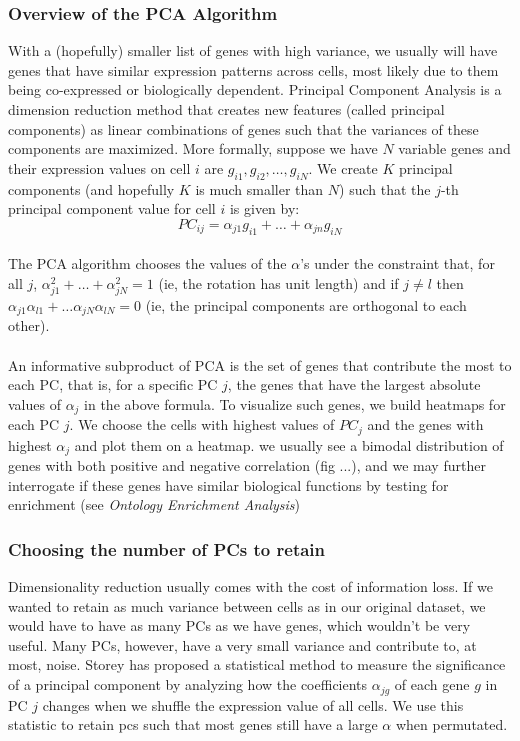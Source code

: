 \subsubsection{Overview of the PCA Algorithm}
With a (hopefully) smaller list of genes with high variance, we usually will have genes that have similar expression patterns across cells, most likely due to them being co-expressed or biologically dependent. Principal Component Analysis is a dimension reduction method that creates new features (called principal components) as linear combinations of genes such that the variances of these components are maximized. More formally, suppose we have $N$ variable genes and their expression values on cell $i$ are $g_{i1}, g_{i2}, \dots, g_{iN}$. We create $K$ principal components (and hopefully $K$ is much smaller than $N$) such that the $j$-th principal component value for cell $i$ is given by:
$$
PC_{ij} = \alpha_{j1} g_{i1} + \dots + \alpha_{jn} g_{iN}
$$
\\
The PCA algorithm chooses the values of the $\alpha$'s under the constraint that, for all $j$, $\alpha_{j1}^2 + \dots + \alpha_{jN}^2 = 1$ (ie, the rotation has unit length) and if $j \neq l$ then $\alpha_{j1}\alpha_{l1} + \dots \alpha_{jN}\alpha_{lN} = 0$ (ie, the principal components are orthogonal to each other). \\
\\
An informative subproduct of PCA is the set of genes that contribute the most to each PC, that is, for a specific PC $j$, the genes that have the largest absolute values of $\alpha_j$ in the above formula. To visualize such genes, we build heatmaps for each PC $j$. We choose the cells with highest values of $PC_j$ and the genes with highest $\alpha_j$ and plot them on a heatmap. we usually see a bimodal distribution of genes with both positive and negative correlation (fig ...), and we may further interrogate if these genes have similar biological functions by testing for enrichment (see \emph{Ontology Enrichment Analysis})

\subsubsection{Choosing the number of PCs to retain}
Dimensionality reduction usually comes with the cost of information loss. If we wanted to retain as much variance between cells as in our original dataset, we would have to have as many PCs as we have genes, which wouldn't be very useful. Many PCs, however, have a very small variance and contribute to, at most, noise. Storey \cite{chung2015statistical} has proposed a statistical method to measure the significance of a principal component by analyzing how the coefficients $\alpha_{jg}$ of each gene $g$ in PC $j$ changes when we shuffle the expression value of all cells. We use this statistic to retain pcs such that most genes still have a large $\alpha$ when permutated. 

